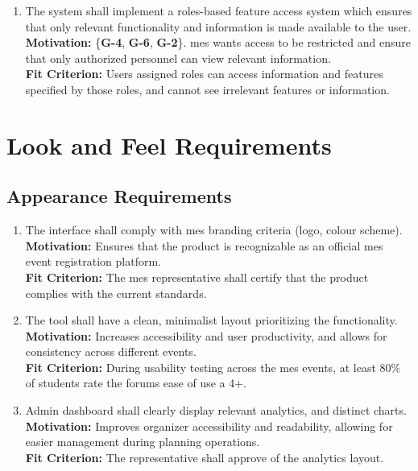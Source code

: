 \documentclass[12pt]{article}
\begin{document}
\begin{enumerate}[align=left,
  leftmargin=*,
  labelsep=1em,
  itemindent=0em,
  label=\bfseries FR-\arabic*:,
  ref=\bfseries FR-\arabic*]
    once an event has completed.\\[2mm]
  {\bf Motivation:} \{\textbf{G-5}, \textbf{G-4}, \textbf{G-3}\}. See \ref{FR9}.\\
  {\bf Fit Criterion:} See \ref{FR9}.
  \item \label{FR11} The system shall implement a roles-based feature access system which ensures that only relevant
    functionality and information is made available to the user.\\[2mm]
    {\bf Motivation:} \{{\bf G-4}, {\bf G-6}, {\bf G-2}\}. \Gls{mes} wants access to be restricted and ensure that
    only authorized personnel can view relevant information.\\
    {\bf Fit Criterion:} Users assigned roles can access information and features specified by those roles, and cannot
    see irrelevant features or information.
\end{enumerate}

\section{Look and Feel Requirements}
\subsection{Appearance Requirements}
\begin{enumerate}[label=LFR-AP.\arabic*, wide=0pt, leftmargin=*]
  \item The interface shall comply with \gls{mes} branding criteria (logo, colour scheme).\\[2mm]
    {\bf Motivation:} Ensures that the product is recognizable as an official \gls{mes} event registration platform.\\
    {\bf Fit Criterion:} The \gls{mes} representative shall certify that the product complies with the current standards.
  \item The tool shall have a clean, minimalist layout prioritizing the functionality.\\[2mm]
    {\bf Motivation:} Increases accessibility and user productivity, and allows for consistency across different events.\\
    {\bf Fit Criterion:} During usability testing across the \gls{mes} events, at least 80\% of students rate the forums ease of use a 4+.
  \item Admin dashboard shall clearly display relevant analytics, and distinct charts.\\[2mm]
    {\bf Motivation:} Improves organizer accessibility and readability, allowing for easier management during planning operations.\\
    {\bf Fit Criterion:} The representative shall approve of the analytics layout.
\end{enumerate}
\end{document}
